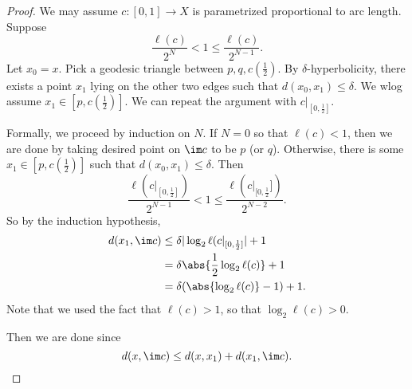 \documentclass[a4paper]{article}
\begin{document}
\begin{proof}
  We may assume $c: [0, 1] \to X$ is parametrized proportional to arc length. Suppose
  \[
    \frac{\ell(c)}{2^N} < 1 \leq \frac{\ell(c)}{2^{N - 1}}.
  \]
  Let $x_0 = x$. Pick a geodesic triangle between $p, q, c(\frac{1}{2})$. By $\delta$-hyperbolicity, there exists a point $x_1$ lying on the other two edges such that $d(x_0, x_1) \leq \delta$. We wlog assume $x_1 \in [p, c(\frac{1}{2})]$. We can repeat the argument with $c|_{[0, \frac{1}{2}]}$.

  \begin{center}
  \end{center}

  Formally, we proceed by induction on $N$. If $N = 0$ so that $\ell(c) < 1$, then we are done by taking desired point on $\im c$ to be $p$ (or $q$). Otherwise, there is some $x_1 \in [p, c(\frac{1}{2})]$ such that $d(x_0, x_1) \leq \delta$. Then
  \[
    \frac{\ell(c|_{[0, \frac{1}{2}]})}{2^{N - 1}} < 1 \leq \frac{\ell(c|_{[0, \frac{1}2}])}{2^{N - 2}}.
  \]
  So by the induction hypothesis,
  \begin{align*}
    d(x_1, \im c) &\leq \delta |\log_2 \ell(c|_{[0, \frac{1}{2}]}| + 1\\
    &= \delta \abs{ \frac{1}{2}\log_2 \ell(c)} + 1\\
    &= \delta (\abs{\log_2 \ell(c)} - 1) + 1.
  \end{align*}
  Note that we used the fact that $\ell(c) > 1$, so that $\log_2 \ell(c) > 0$.

  Then we are done since
  \[
    d(x, \im c) \leq d(x, x_1) + d(x_1, \im c).\qedhere
  \]
\end{proof}
\end{document}
